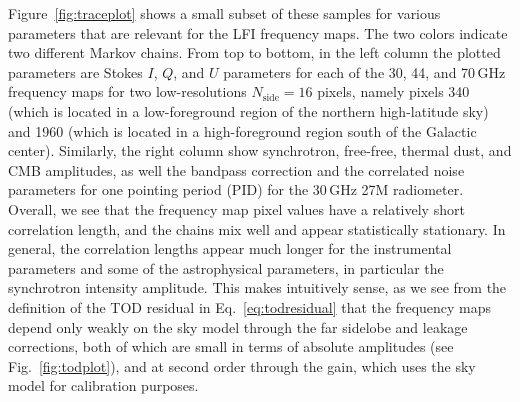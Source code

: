 \documentclass[twocolumn]{aa}
\begin{document}
Figure~\ref{fig:traceplot} shows a small subset of these samples for
various parameters that are relevant for the LFI frequency maps. The
two colors indicate two different Markov chains. From top to bottom,
in the left column the plotted parameters are Stokes $I$, $Q$, and $U$
parameters for each of the 30, 44, and 70\,GHz frequency maps for two
low-resolutions $N_{\mathrm{side}}=16$ pixels, namely pixels 340
(which is located in a low-foreground region of the northern
high-latitude sky) and 1960 (which is located in a high-foreground
region south of the Galactic center). Similarly, the right column show
synchrotron, free-free, thermal dust, and CMB amplitudes, as well the
bandpass correction and the correlated noise parameters for one
pointing period (PID) for the 30\,GHz 27M radiometer. Overall, we see
that the frequency map pixel values have a relatively short
correlation length, and the chains mix well and appear statistically
stationary. In general, the correlation lengths appear much longer for
the instrumental parameters and some of the astrophysical parameters,
in particular the synchrotron intensity amplitude. This makes
intuitively sense, as we see from the definition of the TOD residual
in Eq.~\eqref{eq:todresidual} that the frequency maps depend only
weakly on the sky model through the far sidelobe and leakage
corrections, both of which are small in terms of absolute amplitudes
(see Fig.~\ref{fig:todplot}), and at second order through the gain,
which uses the sky model for calibration purposes.
\end{document}

